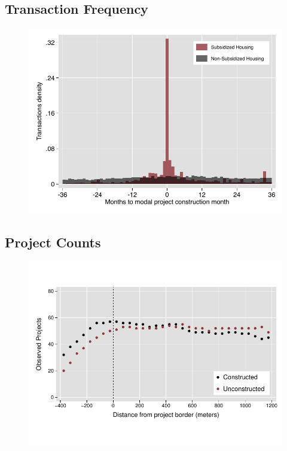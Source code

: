 \documentclass[12pt]{article}
\begin{document}
\subsection{Transaction Frequency}
\label{appendix:histfreq}
\vspace{-5mm}
\begin{figure}[h!]
\centering
\includegraphics[scale=1.2,trim={.2cm 0.2cm .2cm 0.2cm},clip]{figures/transactions_histogram.pdf}
\end{figure}

\pagebreak
\subsection{Project Counts}
\label{appendix:projectcounts}
\vspace{-5mm}
\begin{figure}[h!]
\centering
\includegraphics[scale=1.2,trim={.2cm 1.2cm .2cm 1.2cm},clip]{figures/projectcounts.pdf}
\end{figure}
\end{document}

